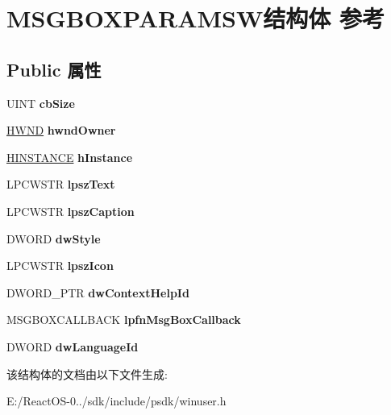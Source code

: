\hypertarget{struct_m_s_g_b_o_x_p_a_r_a_m_s_w}{}\section{M\+S\+G\+B\+O\+X\+P\+A\+R\+A\+M\+S\+W结构体 参考}
\label{struct_m_s_g_b_o_x_p_a_r_a_m_s_w}
\subsection*{Public 属性}
\begin{DoxyCompactItemize}
\item 
\mbox{\label{struct_m_s_g_b_o_x_p_a_r_a_m_s_w_ae1ca97edc23b23e85aa5e0a4fbd13bc3}} 
U\+I\+NT {\bfseries cb\+Size}
\item 
\mbox{\label{struct_m_s_g_b_o_x_p_a_r_a_m_s_w_a1a44fd36ff5feeaaf351ca44458d430f}} 
\hyperlink{interfacevoid}{H\+W\+ND} {\bfseries hwnd\+Owner}
\item 
\mbox{\label{struct_m_s_g_b_o_x_p_a_r_a_m_s_w_aacbb49708db90535f7fd75fd8c9e8b2e}} 
\hyperlink{interfacevoid}{H\+I\+N\+S\+T\+A\+N\+CE} {\bfseries h\+Instance}
\item 
\mbox{\label{struct_m_s_g_b_o_x_p_a_r_a_m_s_w_a7d9f9849a825837c62b6d9facef64e96}} 
L\+P\+C\+W\+S\+TR {\bfseries lpsz\+Text}
\item 
\mbox{\label{struct_m_s_g_b_o_x_p_a_r_a_m_s_w_a0810d7caa9f61efdf7f71b9123236b5c}} 
L\+P\+C\+W\+S\+TR {\bfseries lpsz\+Caption}
\item 
\mbox{\label{struct_m_s_g_b_o_x_p_a_r_a_m_s_w_ae71524fc52b1aec11547d0b48eb3a2f9}} 
D\+W\+O\+RD {\bfseries dw\+Style}
\item 
\mbox{\label{struct_m_s_g_b_o_x_p_a_r_a_m_s_w_a45fe96a589ce2d854c58be4050f7d851}} 
L\+P\+C\+W\+S\+TR {\bfseries lpsz\+Icon}
\item 
\mbox{\label{struct_m_s_g_b_o_x_p_a_r_a_m_s_w_a194631cf16a56141dcb9caf3525fc60a}} 
D\+W\+O\+R\+D\+\_\+\+P\+TR {\bfseries dw\+Context\+Help\+Id}
\item 
\mbox{\label{struct_m_s_g_b_o_x_p_a_r_a_m_s_w_a472619031ad87f93c6bf9e2ea628e0d4}} 
M\+S\+G\+B\+O\+X\+C\+A\+L\+L\+B\+A\+CK {\bfseries lpfn\+Msg\+Box\+Callback}
\item 
\mbox{\label{struct_m_s_g_b_o_x_p_a_r_a_m_s_w_a00f1fd28c9624fa3d573305cb04faca3}} 
D\+W\+O\+RD {\bfseries dw\+Language\+Id}
\end{DoxyCompactItemize}


该结构体的文档由以下文件生成\+:\begin{DoxyCompactItemize}
\item 
E\+:/\+React\+O\+S-\/0../sdk/include/psdk/winuser.\+h\end{DoxyCompactItemize}
